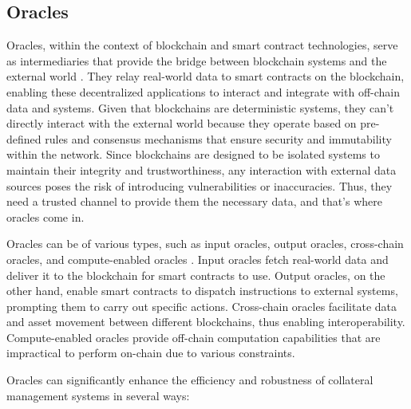 \subsection{Oracles}
\label{subsec:oracles}
Oracles, within the context of blockchain and smart contract technologies, serve as intermediaries that provide the bridge between blockchain systems and the external world \citep{al2020trustworthy}. They relay real-world data to smart contracts on the blockchain, enabling these decentralized applications to interact and integrate with off-chain data and systems. Given that blockchains are deterministic systems, they can't directly interact with the external world because they operate based on pre-defined rules and consensus mechanisms that ensure security and immutability within the network. Since blockchains are designed to be isolated systems to maintain their integrity and trustworthiness, any interaction with external data sources poses the risk of introducing vulnerabilities or inaccuracies. Thus, they need a trusted channel to provide them the necessary data, and that's where oracles come in.

Oracles can be of various types, such as input oracles, output oracles, cross-chain oracles, and compute-enabled oracles \citep{types_oracles}. Input oracles fetch real-world data and deliver it to the blockchain for smart contracts to use. Output oracles, on the other hand, enable smart contracts to dispatch instructions to external systems, prompting them to carry out specific actions. Cross-chain oracles facilitate data and asset movement between different blockchains, thus enabling interoperability. Compute-enabled oracles provide off-chain computation capabilities that are impractical to perform on-chain due to various constraints.

Oracles can significantly enhance the efficiency and robustness of collateral management systems in several ways:

